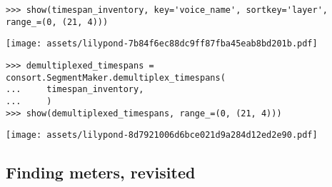 \begin{comment}
<abjad>
show(timespan_inventory, key='voice_name', sortkey='layer', range_=(0, (21, 4)))
</abjad>
\end{comment}

\begin{abjadbookoutput}
\begin{singlespacing}
\vspace{-0.5\baselineskip}
\begin{lstlisting}
>>> show(timespan_inventory, key='voice_name', sortkey='layer', range_=(0, (21, 4)))
\end{lstlisting}
\noindent\texttt{[image: assets/lilypond-7b84f6ec88dc9ff87fba45eab8bd201b.pdf]}
\end{singlespacing}
\end{abjadbookoutput}

\begin{comment}
<abjad>
demultiplexed_timespans = consort.SegmentMaker.demultiplex_timespans(
    timespan_inventory,
    )
show(demultiplexed_timespans, range_=(0, (21, 4)))
</abjad>
\end{comment}

\begin{abjadbookoutput}
\begin{singlespacing}
\vspace{-0.5\baselineskip}
\begin{lstlisting}
>>> demultiplexed_timespans = consort.SegmentMaker.demultiplex_timespans(
...     timespan_inventory,
...     )
>>> show(demultiplexed_timespans, range_=(0, (21, 4)))
\end{lstlisting}
\noindent\texttt{[image: assets/lilypond-8d7921006d6bce021d9a284d12ed2e90.pdf]}
\end{singlespacing}
\end{abjadbookoutput}

\subsection{Finding meters, revisited}
\label{ssec:finding-meters-revisited}

